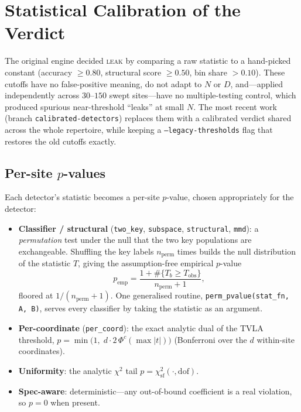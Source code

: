 \documentclass[11pt]{article}
\newcommand{\code}[1]{\texttt{#1}}
\begin{document}
\section{Statistical Calibration of the Verdict}\label{sec:calib}

The original engine decided \textsc{leak} by comparing a raw statistic to a
hand-picked constant (accuracy $\geq 0.80$, structural score $\geq 0.50$, bin share
$>0.10$). These cutoffs have no false-positive meaning, do not adapt to $N$ or $D$,
and---applied independently across $30$--$150$ swept sites---have no
multiple-testing control, which produced spurious near-threshold ``leaks'' at small
$N$. The most recent work (branch \code{calibrated-detectors}) replaces them with a
calibrated verdict shared across the whole repertoire, while keeping a
\code{--legacy-thresholds} flag that restores the old cutoffs exactly.

\subsection{Per-site $p$-values}
Each detector's statistic becomes a per-site $p$-value, chosen appropriately for the
detector:
\begin{itemize}[leftmargin=1.4em]
  \item \textbf{Classifier / structural} (\code{two\_key}, \code{subspace},
  \code{structural}, \code{mmd}): a \emph{permutation} test under the null that the
  two key populations are exchangeable. Shuffling the key labels $n_{\text{perm}}$
  times builds the null distribution of the statistic $T$, giving the
  assumption-free empirical $p$-value
  \[
    p_{\text{emp}}=\frac{1+\#\{T_b\geq T_{\text{obs}}\}}{n_{\text{perm}}+1},
  \]
  floored at $1/(n_{\text{perm}}+1)$. One generalised routine,
  \code{perm\_pvalue(stat\_fn,\,A,\,B)}, serves every classifier by taking the
  statistic as an argument.
  \item \textbf{Per-coordinate} (\code{per\_coord}): the exact analytic dual of the
  TVLA threshold, $p=\min\!\big(1,\;d\cdot 2\,\Phi^{c}(\max|t|)\big)$ (Bonferroni
  over the $d$ within-site coordinates).
  \item \textbf{Uniformity}: the analytic $\chi^2$ tail $p=\chi^2_{\text{sf}}(\cdot,
  \text{dof})$.
  \item \textbf{Spec-aware}: deterministic---any out-of-bound coefficient is a real
  violation, so $p=0$ when present.
\end{itemize}
\end{document}
